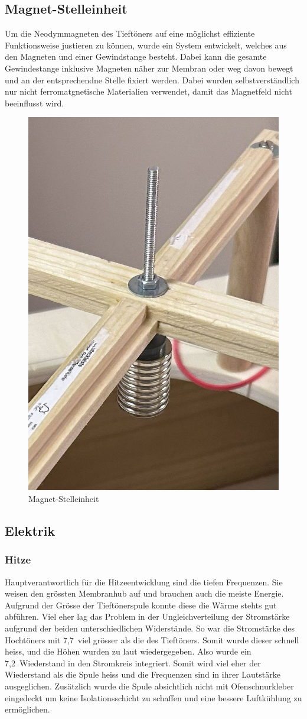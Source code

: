 \documentclass[a4paper,11pt]{report}
\begin{document}
\subsection{Magnet-Stelleinheit}
Um die Neodymmagneten des Tieftöners auf eine möglichst effiziente Funktionsweise justieren zu können, wurde ein System entwickelt, welches aus den Magneten und einer Gewindstange besteht. Dabei kann die gesamte Gewindestange inklusive Magneten näher zur Membran oder weg davon bewegt und an der entsprechendne Stelle fixiert werden. Dabei wurden selbstverständlich nur nicht ferromatgnetische Materialien verwendet, damit das Magnetfeld nicht beeinflusst wird.

\begin{figure}[h]
    \centering
    \includegraphics[width=.3\linewidth]{resources/images/Fotos/Physik-86.jpg}
    \caption{{Magnet-Stelleinheit}}
    \label{fig:magnet}
\end{figure}

\newpage
\subsection{Elektrik}
\subsubsection*{Hitze}
Hauptverantwortlich für die Hitzeentwicklung sind die tiefen Frequenzen. Sie weisen den grössten Membranhub auf und brauchen auch die meiste Energie. Aufgrund der Grösse der Tieftönerspule konnte diese die Wärme stehts gut abführen. Viel eher lag das Problem in der Ungleichverteilung der Stromstärke aufgrund der beiden unterschiedlichen Widerstände. So war die Stromstärke des Hochtöners mit 7,7\Omega\ viel grösser als die des Tieftöners. Somit wurde dieser schnell heiss, und die Höhen wurden zu laut wiedergegeben. Also wurde ein 7,2\Omega\ Wiederstand in den Stromkreis integriert. Somit wird viel eher der Wiederstand als die Spule heiss und die Frequenzen sind in ihrer Lautstärke ausgeglichen. Zusätzlich wurde die Spule absichtlich nicht mit Ofenschnurkleber eingedeckt um keine Isolationsschicht zu schaffen und eine bessere Luftkühlung zu ermöglichen.
\end{document}
